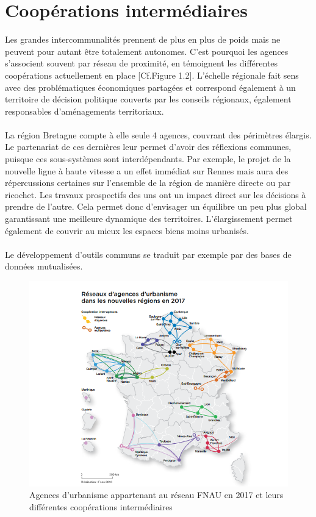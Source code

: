 \documentclass{bredele}
\begin{document}
\section{Coopérations intermédiaires}
Les grandes intercommunalités prennent de plus en plus de poids mais ne peuvent pour autant être totalement autonomes. C’est pourquoi les agences s’associent souvent par réseau de proximité, en témoignent les différentes coopérations actuellement en place [Cf.Figure 1.2]. L’échelle régionale fait sens avec des problématiques économiques partagées et correspond également à un territoire de décision politique couverts par les conseils régionaux, également responsables d'aménagements territoriaux.
\\\\La région Bretagne compte à elle seule 4 agences, couvrant des périmètres élargis. Le partenariat de ces dernières leur permet d’avoir des réflexions communes, puisque ces sous-systèmes sont interdépendants. Par exemple, le projet de la nouvelle ligne à haute vitesse a un effet immédiat sur Rennes mais aura des répercussions certaines sur l'ensemble de la région de manière directe ou par ricochet. Les travaux prospectifs des uns ont un impact direct sur les décisions à prendre de l’autre. Cela permet donc d’envisager un équilibre un peu plus global garantissant une meilleure dynamique des territoires. L’élargissement permet également de couvrir au mieux les espaces biens moins urbanisés.
\\\\Le développement d’outils communs se traduit par exemple par  des bases de données mutualisées.
\begin{figure}
\includegraphics[width=\textwidth]{AgenceFNAU.png}
\caption{Agences d'urbanisme appartenant au réseau FNAU en 2017 et leurs différentes coopérations intermédiaires}
\begin{flushright}
\end{flushright}
\end{figure}
\end{document}
